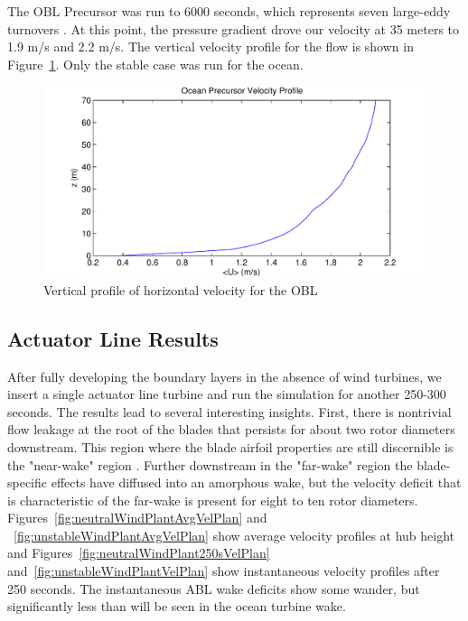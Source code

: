 The OBL Precursor was run to 6000 seconds, which represents seven large-eddy turnovers \cite{churchfield_large-eddy_2012}. At this point, the pressure gradient drove our velocity at 35 meters to 1.9 m/s and 2.2 m/s. The vertical velocity profile for the flow is shown in Figure~\ref{fig:ocean-vertical-speed-profile}. Only the stable case was run for the ocean.

\begin{figure}
\centering
\includegraphics[width=.6\textwidth]{images/ocean-vertical-speed-profile}
\caption{Vertical profile of horizontal velocity for the OBL}
\label{fig:ocean-vertical-speed-profile}
\end{figure}

\subsection{Actuator Line Results}
After fully developing the boundary layers in the absence of wind turbines, we insert a single actuator line turbine and run the simulation for another 250-300 seconds.  The results lead to several interesting insights.  First, there is nontrivial flow leakage at the root of the blades that persists for about two rotor diameters downstream.  This region where the blade airfoil properties are still discernible is the "near-wake" region \cite{sanderse_review_2011}.  Further downstream in the "far-wake" region the blade-specific effects have diffused into an amorphous wake, but the velocity deficit that is characteristic of the far-wake is present for eight to ten rotor diameters.  Figures~\ref{fig:neutralWindPlantAvgVelPlan} and ~\ref{fig:unstableWindPlantAvgVelPlan} show average velocity profiles at hub height and Figures~\ref{fig:neutralWindPlant250sVelPlan} and~\ref{fig:unstableWindPlantVelPlan} show instantaneous velocity profiles after 250 seconds.  The instantaneous ABL wake deficits show some wander, but significantly less than will be seen in the ocean turbine wake.

